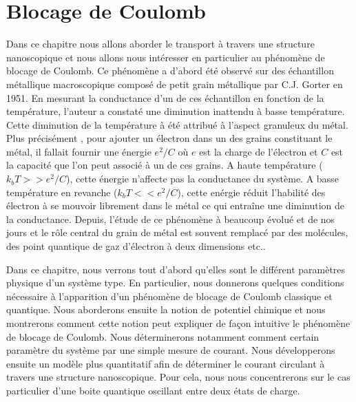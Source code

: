 

\chapter{Blocage de Coulomb}

Dans ce chapitre nous allons aborder le transport à travers une structure nanoscopique et nous allons nous intéresser en particulier au phénomène de blocage de Coulomb. Ce phénomène a d'abord été observé sur des échantillon métallique macroscopique composé de petit grain métallique par C.J. Gorter en 1951. En mesurant la conductance d'un de ces échantillon en fonction de la température, l'auteur a constaté une diminution inattendu à basse température. Cette diminution de la température à été attribué à l'aspect granuleux du métal. Plus précisément , pour ajouter un électron dans un des grains constituant le métal, il fallait fournir une énergie $e^2/C$ où $e$ est la charge de l'électron et $C$ est la capacité que l'on peut associé à un de ces grains. A haute température ($k_bT >> e^2/C$), cette énergie n'affecte pas la conductance du système. A basse température en revanche ($k_bT << e^2/C$), cette enérgie réduit l'habilité des électron à se mouvoir librement dans le métal ce qui entraîne une diminution de la conductance. Depuis, l'étude de ce phénomène à beaucoup évolué et de nos jours et le rôle central du grain de métal est souvent remplacé par des molécules, des point quantique de gaz d'électron à deux dimensions etc..

Dans ce chapitre, nous verrons tout d'abord qu'elles sont le différent paramètres physique d'un système type. En particulier, nous donnerons quelques conditions nécessaire à l'apparition d'un phénomène de blocage de Coulomb classique et quantique. Nous aborderons ensuite la notion de potentiel chimique et nous montrerons comment cette notion peut expliquer de façon intuitive le phénomène de blocage de Coulomb. Nous déterminerons notamment comment certain paramètre du système par une simple mesure de courant. Nous développerons ensuite un modèle plus quantitatif afin de déterminer le courant circulant à travers une structure nanoscopique. Pour cela, nous nous concentrerons sur le cas particulier d'une boite quantique oscillant entre deux états de charge.



